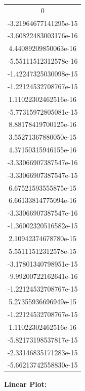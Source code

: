 \documentclass{article}
\newcommand{\n}{\newline}
\begin{document}
\begin{center}
{\begin{tabular}{c}
				0\\
				-3.21964677141295e-15\\
				-3.60822483003176e-16\\
				4.44089209850063e-16\\
				-5.55111512312578e-16\\
				-1.42247325030098e-15\\
				-1.22124532708767e-15\\
				1.11022302462516e-16\\
				-5.77315972805081e-15\\
				8.88178419700125e-16\\
				3.55271367880050e-15\\
				4.37150315946155e-16\\
				-3.33066907387547e-16\\
				-3.33066907387547e-15\\
				6.67521593555875e-15\\
				6.66133814775094e-16\\
				-3.33066907387547e-16\\
				-1.36002320516582e-15\\
				2.10942374678780e-15\\
				5.55111512312578e-15\\
				-3.17801340798951e-15\\
				-9.99200722162641e-16\\
				-1.22124532708767e-15\\
				5.27355936696949e-15\\
				-1.22124532708767e-15\\
				1.11022302462516e-16\\
				-5.82173198537817e-15\\
				-2.33146835171283e-15\\
				-5.66213742558830e-15
			\end{tabular}
		}
		\newpage
		\textbf{Linear Plot: \n}
		

\end{center}
\end{document}
